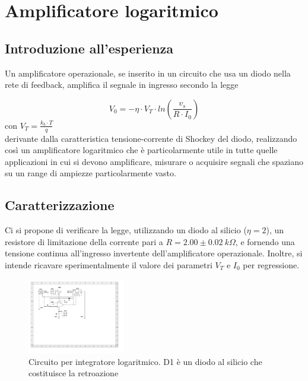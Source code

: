 \documentclass[journal]{IEEEtran}
\begin{document}

\section{\textbf{Amplificatore logaritmico}} %
\subsection{\textbf{Introduzione all'esperienza}}
Un amplificatore operazionale, se inserito in un circuito che usa un diodo nella rete di feedback, amplifica il segnale in ingresso secondo la legge

\begin{equation}
V_0 = - \eta \cdot V_T \cdot ln( \frac{v_s}{R \cdot I_0} )
\end{equation}
con $V_T = \frac{k_{b} \cdot T}{q}$ \\

derivante dalla caratteristica tensione-corrente di Shockey del diodo,  realizzando così un amplificatore logaritmico che è particolarmente utile in tutte quelle applicazioni in cui si devono amplificare, misurare o acquisire segnali che spaziano su un range di ampiezze particolarmente vasto.

\subsection{\textbf{Caratterizzazione}}
Ci si propone di verificare la legge, utilizzando un diodo al silicio ($\eta = 2$), un resistore di limitazione della corrente pari a $R = 2.00 \pm 0.02 \ k\Omega$, e fornendo una tensione continua all'ingresso invertente dell'amplificatore operazionale. Inoltre, si intende ricavare sperimentalmente il valore dei parametri $V_T$ e $I_0$ per regressione.

\begin{figure}[H]%
\begin {center}
\includegraphics[width=0.38\textwidth]{sch-simulations/output/OPA-log.pdf}
\caption{Circuito per integratore logaritmico. D1 è un diodo al silicio che costituisce la retroazione}
\label{fig:circ_log_ampl}
\end {center}
\end{figure}
\end{document}
